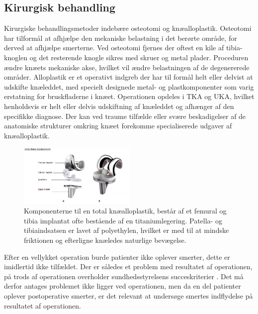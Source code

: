 \subsection{Kirurgisk behandling}

Kirurgiske behandlingsmetoder indebære osteotomi og knæalloplastik. Osteotomi har tilformål at afhjælpe den mekaniske belastning i det berørte område, for derved at afhjælpe smerterne. Ved osteotomi fjernes der oftest en kile af tibia-knoglen og det resterende knogle sikres med skruer og metal plader. Proceduren ændre knæets mekaniske akse, hvilket vil ændre belastningen af de degenererede områder. \citep{Osteotomi_og_TKA}
Alloplastik er et operativt indgreb der har til formål helt eller delvist at udskifte knæleddet, med specielt designede metal- og plastkomponenter som varig erstatning for bruskfladerne i knæet. Operationen opdeles i TKA og UKA, hvilket henholdsvis er helt eller delvis udskiftning af knæleddet og afhænger af den specifikke diagnose. Der kan ved traume tilfælde eller svære beskadigelser af de anatomiske strukturer omkring knæet forekomme specialiserede udgaver af knæalloplastik.

\begin{figure}[H] 
	\begin{center}
		\includegraphics[width=0.5\textwidth]{../figures/tka_implant}
	\end{center}
	\caption{Komponenterne til en total knæalloplastik, består af et femural og tibia implantat ofte bestående af en titaniumlegering. Patella- og tibiaindsatsen er lavet af polyethylen, hvilket er med til at mindske friktionen og efterligne knæledes naturlige bevægelse.\citep{1}} 
	\label{fig:tka_implant} 
\end{figure}

Efter en vellykket operation burde patienter ikke oplever smerter, dette er imidlertid ikke tilfældet. Der er således et problem med resultatet af operationen, på trods af operationen overholder sundhedsstyrelsens succeskriterier \citep{aarsrapport2016}. Det må derfor antages problemet ikke ligger ved operationen, men da en del patienter oplever postoperative smerter, er det relevant at undersøge smertes indflydelse på resultatet af operationen. 

